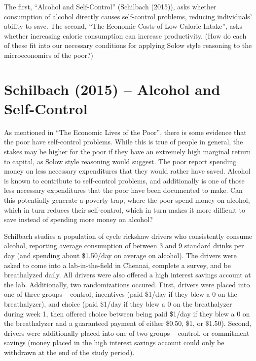 \documentclass[12pt,english]{article}
\begin{document}
The first, ``Alcohol and Self-Control'' (Schilbach (2015)), asks whether consumption of alcohol directly causes self-control problems, reducing individuals' ability to save. The second, ``The Economic Costs of Low Calorie Intake'', asks whether increasing caloric consumption can increase productivity. (How do each of these fit into our necessary conditions for applying Solow style reasoning to the microeconomics of the poor?)

\section{Schilbach (2015) -- Alcohol and Self-Control}

As mentioned in ``The Economic Lives of the Poor'', there is some evidence that the poor have self-control problems. While this is true of people in general, the stakes may be higher for the poor if they have an extremely high marginal return to capital, as Solow style reasoning would suggest. The poor report spending money on less necessary expenditures that they would rather have saved. Alcohol is known to contribute to self-control problems, and additionally is one of those less necessary expenditures that the poor have been documented to make. Can this potentially generate a poverty trap, where the poor spend money on alcohol, which in turn reduces their self-control, which in turn makes it more difficult to save instead of spending more money on alcohol?

Schilbach studies a population of cycle rickshaw drivers who consistently consume alcohol, reporting average consumption of between 3 and 9 standard drinks per day (and spending about \$1.50/day on average on alcohol). The drivers were asked to come into a lab-in-the-field in Chennai, complete a survey, and be breathalyzed daily. All drivers were also offered a high interest savings account at the lab. Additionally, two randomizations occured. First, drivers were placed into one of three groups -- control, incentives (paid \$1/day if they blew a 0 on the breathalyzer), and choice (paid \$1/day if they blew a 0 on the breathalyzer during week 1, then offered choice between being paid \$1/day if they blew a 0 on the breathalyzer and a guaranteed payment of either \$0.50, \$1, or \$1.50). Second, drivers were additionally placed into one of two groups -- control, or commitment savings (money placed in the high interest savings account could only be withdrawn at the end of the study period).
\end{document}
